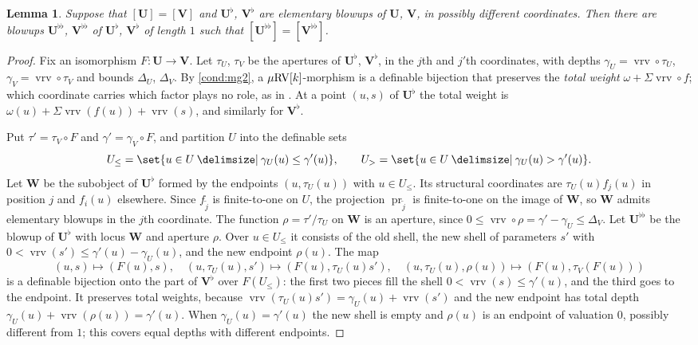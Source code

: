 \documentclass[12pt]{amsart}
\newcommand{\memph}[1]{{\color{magenta}\emph{#1}}}
\theoremstyle{plain}
\newtheorem{lem}[thm]{Lemma}
\theoremstyle{definition}
\theoremstyle{remark}
\numberwithin{equation}{section}
\theoremstyle{plain}
\newcommand{\RV}{\textup{RV}}
\DeclareMathOperator{\pr}{pr}
\newcommand{\0}{\emptyset}
\newcommand{\fun}{\longrightarrow}
\newcommand{\efun}{\longmapsto}
\providecommand\given{}
\newcommand\SetSymbol[1][]{%
\nonscript \: #1 \vert
\allowbreak
\nonscript\:
\mathopen{}}
\renewcommand\given{\SetSymbol[\delimsize]}
\newcommand{\mRV}{{\mu}{\RV}}
\DeclareMathOperator{\vrv}{vrv}
\begin{document}
\begin{lem}\label{elementary:blowups:preserves:iso:vol}
Suppose that $[\bm U] = [\bm V]$ and $\bm U^{\flat}$, $\bm V^{\flat}$ are elementary blowups of $\bm U$, $\bm V$, in possibly different coordinates. Then there are  blowups $\bm U^{\flat\flat}$, $\bm V^{\flat\flat}$ of $\bm U^{\flat}$, $\bm V^{\flat}$ of length $1$ such that $[\bm U^{\flat\flat}] = [\bm V^{\flat\flat}]$.
\end{lem}
\begin{proof}
Fix an isomorphism $F : \bm U \fun \bm V$. Let $\tau_U$, $\tau_V$ be the apertures of $\bm U^{\flat}$, $\bm V^{\flat}$, in the $j$th and $j'$th coordinates, with depths $\gamma_U = \vrv \circ \tau_U$, $\gamma_V = \vrv \circ \tau_V$ and bounds $\Delta_U$, $\Delta_V$. By \eqref{cond:mg2}, a $\mRV[k]$-morphism is a definable bijection that preserves the \memph{total weight} $\omega + \Sigma \vrv \circ f$; which coordinate carries which factor plays no role, as in \cite[Lemma~6.3]{Yin:int:acvf}. At a point $(u, s)$ of $\bm U^{\flat}$ the total weight is $\omega(u) + \Sigma \vrv(f(u)) + \vrv(s)$, and similarly for $\bm V^{\flat}$.

Put $\tau' = \tau_V \circ F$ and $\gamma' = \gamma_V \circ F$, and partition $U$ into the definable sets
\[
U_{\leq} = \set{u \in U \given \gamma_U(u) \leq \gamma'(u)}, \qquad U_{>} = \set{u \in U \given \gamma_U(u) > \gamma'(u)}.
\]
Let $\bm W$ be the subobject of $\bm U^{\flat}$ formed by the endpoints $(u, \tau_U(u))$ with $u \in U_{\leq}$. Its structural coordinates are $\tau_U(u) f_j(u)$ in position $j$ and $f_i(u)$ elsewhere. Since $f_{\tilde j}$ is finite-to-one on $U$, the projection $\pr_{\tilde j}$ is finite-to-one on the image of $\bm W$, so $\bm W$ admits elementary blowups in the $j$th coordinate. The function $\rho = \tau'/\tau_U$ on $\bm W$ is an aperture, since $0 \leq \vrv \circ \rho = \gamma' - \gamma_U \leq \Delta_V$. Let $\bm U^{\flat\flat}$ be the blowup of $\bm U^{\flat}$ with locus $\bm W$ and aperture $\rho$. Over $u \in U_{\leq}$ it consists of the old shell, the new shell of parameters $s'$ with $0 < \vrv(s') \leq \gamma'(u) - \gamma_U(u)$, and the new endpoint $\rho(u)$. The map
\[
(u, s) \efun (F(u), s), \quad (u, \tau_U(u), s') \efun (F(u), \tau_U(u) s'), \quad (u, \tau_U(u), \rho(u)) \efun (F(u), \tau_V(F(u)))
\]
is a definable bijection onto the part of $\bm V^{\flat}$ over $F(U_{\leq})$: the first two pieces fill the shell $0 < \vrv(s) \leq \gamma'(u)$, and the third goes to the endpoint. It preserves total weights, because $\vrv(\tau_U(u) s') = \gamma_U(u) + \vrv(s')$ and the new endpoint has total depth $\gamma_U(u) + \vrv(\rho(u)) = \gamma'(u)$. When $\gamma_U(u) = \gamma'(u)$ the new shell is empty and $\rho(u)$ is an endpoint of valuation $0$, possibly different from $1$; this covers equal depths with different endpoints.


\end{proof}
\end{document}
